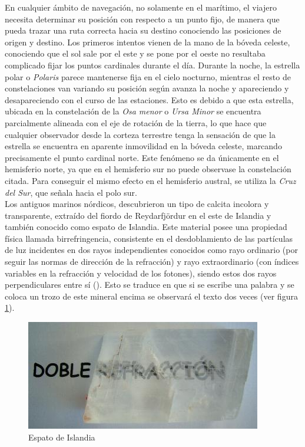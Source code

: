 En cualquier ámbito de navegación, no solamente en el marítimo, el viajero necesita determinar su posición con respecto a un punto fijo, de manera que pueda trazar una ruta correcta hacia su destino conociendo las posiciones de origen y destino. Los primeros intentos vienen de la mano de la bóveda celeste, conociendo que el sol sale por el este y se pone por el oeste no resultaba complicado fijar los puntos cardinales durante el día. Durante la noche, la estrella polar o \textit{Polaris} parece mantenerse fija en el cielo nocturno, mientras el resto de constelaciones van variando su posición según avanza la noche y apareciendo y desapareciendo con el curso de las estaciones. Esto es debido a que esta estrella, ubicada en la constelación de la \textit{Osa menor} o \textit{Ursa Minor} se encuentra parcialmente alineada con el eje de rotación de la tierra, lo que hace que cualquier observador desde la corteza terrestre tenga la sensación de que la estrella se encuentra en aparente inmovilidad en la bóveda celeste, marcando precisamente el punto cardinal norte. Este fenómeno se da únicamente en el hemisferio norte, ya que en el hemisferio sur no puede observase la constelación citada. Para conseguir el mismo efecto en el hemisferio austral, se utiliza la \textit{Cruz del Sur}, que señala hacia el polo sur.\\

Los antiguos marinos nórdicos, descubrieron un tipo de calcita incolora y transparente, extraído del fiordo de Reydarfjördur en el este de Islandia y también conocido como espato de Islandia. Este material posee una propiedad física llamada birrefringencia, consistente en el desdoblamiento de las partículas de luz incidentes en dos rayos independientes conocidos como rayo ordinario (por seguir las normas de dirección de la refracción) y rayo extraordinario (con índices variables en la refracción y velocidad de los fotones), siendo estos dos rayos perpendiculares entre sí (\cite{Aug08}). Esto se traduce en que si se escribe una palabra y se coloca un trozo de este mineral encima se observará el texto dos veces (ver figura \ref{fig:iceland_calcite}).\\

\begin{figure}[h!btp]
\centering
\includegraphics[scale=0.5, fbox={\fboxrule} 4mm]{images/03-antecedentes/54-espato_islandia.jpg}
\caption{Espato de Islandia}
\label{fig:iceland_calcite}
\end{figure}

